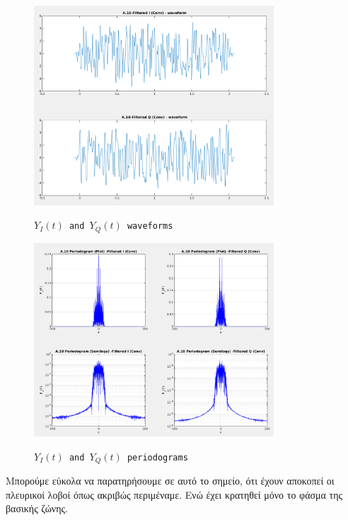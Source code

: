 \documentclass[11pt]{article}
\begin{document}
    \begin{figure}[H]
        \centering
        \includegraphics[scale=0.5, width=0.8\textwidth]{img/A10_filt_wave.png} \\
        \caption{\texttt{$Y_I(t)$ and $Y_Q(t)$ waveforms}}
    \end{figure}
    
    \begin{figure}[H]
        \centering
        \includegraphics[scale=0.5, width=0.8\textwidth]{img/A10_filt_period.png} \\
        \caption{\texttt{$Y_I(t)$ and $Y_Q(t)$ periodograms}}
    \end{figure}
    
    \par \noindent
    Μπορούμε εύκολα να παρατηρήσουμε σε αυτό το σημείο, ότι έχουν αποκοπεί οι πλευρικοί λοβοί όπως ακριβώς περιμέναμε. Ενώ έχει κρατηθεί μόνο το φάσμα της βασικής ζώνης.
    
\end{document}
